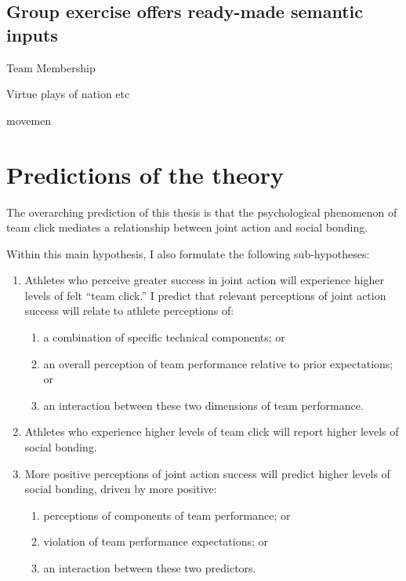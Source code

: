 \begin{CJK}{UTF8}{gbsn}



    \subsection{Group exercise offers ready-made semantic inputs}



    Team Membership

    Virtue plays of nation etc

    movemen




    \section{Predictions of the theory}


        The overarching prediction of this thesis is that the psychological phenomenon of team click mediates a relationship between joint action and social bonding.

        Within this main hypothesis, I also formulate the following sub-hypotheses:
        \begin{enumerate}
          \item Athletes who perceive greater success in joint action will experience higher levels of felt ``team click.'' I predict that relevant perceptions of joint action success will relate to athlete perceptions of:
            \begin{enumerate}
              \item a combination of specific technical components; or
              \item an overall perception of team performance relative to prior expectations; or
              \item an interaction between these two dimensions of team performance.
            \end{enumerate}
          \item Athletes who experience higher levels of team click will report higher levels of social bonding.
          \item More positive perceptions of joint action success will predict higher levels of social bonding, driven by more positive:
          \begin{enumerate}
            \item perceptions of components of team performance; or
            \item violation of team performance expectations; or
            \item an interaction between these two predictors.
          \end{enumerate}
        \end{enumerate}


\end{CJK}
